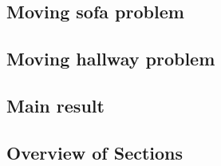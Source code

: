 
\subsection{Moving sofa problem}
\label{sec:moving-sofa-problem}


\subsection{Moving hallway problem}
\label{sec:moving-hallway-problem}


\subsection{Main result}
\label{sec:main-result}


\subsection{Overview of Sections}
\label{sec:overview-of-sections}


